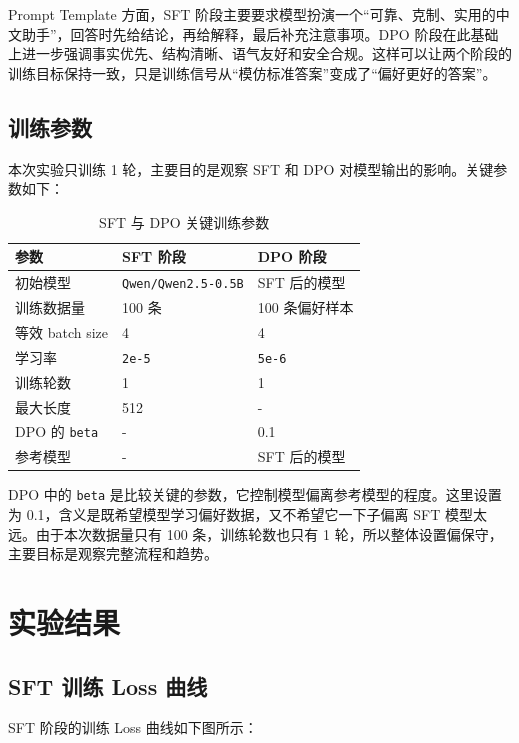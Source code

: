 \documentclass[a4paper,12pt]{ctexart}
\begin{document}
Prompt Template 方面，SFT 阶段主要要求模型扮演一个“可靠、克制、实用的中文助手”，回答时先给结论，再给解释，最后补充注意事项。DPO 阶段在此基础上进一步强调事实优先、结构清晰、语气友好和安全合规。这样可以让两个阶段的训练目标保持一致，只是训练信号从“模仿标准答案”变成了“偏好更好的答案”。

\subsection{训练参数}

本次实验只训练 1 轮，主要目的是观察 SFT 和 DPO 对模型输出的影响。关键参数如下：

\begin{table}[H]
    \centering
    \begin{tabularx}{\textwidth}{L{0.30\textwidth}L{0.28\textwidth}L{0.28\textwidth}}
        \toprule
        参数 & SFT 阶段 & DPO 阶段 \\
        \midrule
        初始模型 & \texttt{Qwen/Qwen2.5-0.5B} & SFT 后的模型 \\
        训练数据量 & 100 条 & 100 条偏好样本 \\
        等效 batch size & 4 & 4 \\
        学习率 & \texttt{2e-5} & \texttt{5e-6} \\
        训练轮数 & 1 & 1 \\
        最大长度 & 512 & - \\
        DPO 的 \texttt{beta} & - & 0.1 \\
        参考模型 & - & SFT 后的模型 \\
        \bottomrule
    \end{tabularx}
    \caption{SFT 与 DPO 关键训练参数}
\end{table}

DPO 中的 \texttt{beta} 是比较关键的参数，它控制模型偏离参考模型的程度。这里设置为 0.1，含义是既希望模型学习偏好数据，又不希望它一下子偏离 SFT 模型太远。由于本次数据量只有 100 条，训练轮数也只有 1 轮，所以整体设置偏保守，主要目标是观察完整流程和趋势。

\section{实验结果}

\subsection{SFT 训练 Loss 曲线}

SFT 阶段的训练 Loss 曲线如下图所示：
\end{document}
